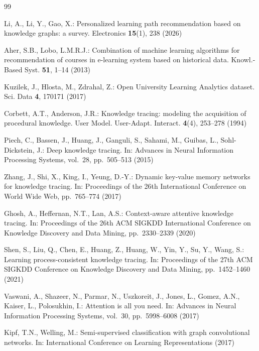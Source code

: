 \documentclass[graybox]{SNmult}
\begin{document}
\begin{thebibliography}{99}

Li, A., Li, Y., Gao, X.: Personalized learning path recommendation based on knowledge
graphs: a survey. Electronics \textbf{15}(1), 238 (2026)

Aher, S.B., Lobo, L.M.R.J.: Combination of machine learning algorithms for recommendation
of courses in e-learning system based on historical data. Knowl.-Based Syst. \textbf{51},
1--14 (2013)

Kuzilek, J., Hlosta, M., Zdrahal, Z.: Open University Learning Analytics dataset. Sci. Data
\textbf{4}, 170171 (2017)

Corbett, A.T., Anderson, J.R.: Knowledge tracing: modeling the acquisition of procedural
knowledge. User Model. User-Adapt. Interact. \textbf{4}(4), 253--278 (1994)

Piech, C., Bassen, J., Huang, J., Ganguli, S., Sahami, M., Guibas, L., Sohl-Dickstein, J.:
Deep knowledge tracing. In: Advances in Neural Information Processing Systems, vol.~28,
pp.~505--513 (2015)

Zhang, J., Shi, X., King, I., Yeung, D.-Y.: Dynamic key-value memory networks for knowledge
tracing. In: Proceedings of the 26th International Conference on World Wide Web,
pp.~765--774 (2017)

Ghosh, A., Heffernan, N.T., Lan, A.S.: Context-aware attentive knowledge tracing. In:
Proceedings of the 26th ACM SIGKDD International Conference on Knowledge Discovery and Data
Mining, pp.~2330--2339 (2020)

Shen, S., Liu, Q., Chen, E., Huang, Z., Huang, W., Yin, Y., Su, Y., Wang, S.: Learning
process-consistent knowledge tracing. In: Proceedings of the 27th ACM SIGKDD Conference on
Knowledge Discovery and Data Mining, pp.~1452--1460 (2021)

Vaswani, A., Shazeer, N., Parmar, N., Uszkoreit, J., Jones, L., Gomez, A.N., Kaiser, L.,
Polosukhin, I.: Attention is all you need. In: Advances in Neural Information Processing
Systems, vol.~30, pp.~5998--6008 (2017)

Kipf, T.N., Welling, M.: Semi-supervised classification with graph convolutional networks.
In: International Conference on Learning Representations (2017)


\end{thebibliography}
\end{document}
